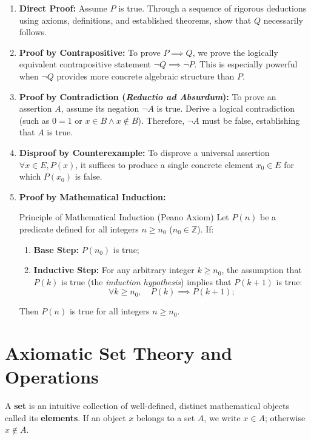 \begin{enumerate}[leftmargin=1.4em,itemsep=4pt]
  \item \textbf{Direct Proof:} Assume $P$ is true. Through a sequence of rigorous deductions using axioms, definitions, and established theorems, show that $Q$ necessarily follows.
  \item \textbf{Proof by Contrapositive:} To prove $P \implies Q$, we prove the logically equivalent contrapositive statement $\neg Q \implies \neg P$. This is especially powerful when $\neg Q$ provides more concrete algebraic structure than $P$.
  \item \textbf{Proof by Contradiction (\textit{Reductio ad Absurdum}):} To prove an assertion $A$, assume its negation $\neg A$ is true. Derive a logical contradiction (such as $0 = 1$ or $x \in B \land x \notin B$). Therefore, $\neg A$ must be false, establishing that $A$ is true.
  \item \textbf{Disproof by Counterexample:} To disprove a universal assertion $\forall x \in E, P(x)$, it suffices to produce a single concrete element $x_0 \in E$ for which $P(x_0)$ is false.
  \item \textbf{Proof by Mathematical Induction:}
  \begin{theorembox}{Principle of Mathematical Induction (Peano Axiom)}
  Let $P(n)$ be a predicate defined for all integers $n \ge n_0$ ($n_0 \in \mathbb{Z}$). If:
  \begin{enumerate}[leftmargin=1.2em,itemsep=2pt]
    \item \textbf{Base Step:} $P(n_0)$ is true;
    \item \textbf{Inductive Step:} For any arbitrary integer $k \ge n_0$, the assumption that $P(k)$ is true (the \textit{induction hypothesis}) implies that $P(k+1)$ is true:
    \[
    \forall k \ge n_0, \quad P(k) \implies P(k+1);
    \]
  \end{enumerate}
  Then $P(n)$ is true for all integers $n \ge n_0$.
  \end{theorembox}
\end{enumerate}

\section{Axiomatic Set Theory and Operations}

A \textbf{set} is an intuitive collection of well-defined, distinct mathematical objects called its \textbf{elements}. If an object $x$ belongs to a set $A$, we write $x \in A$; otherwise $x \notin A$.

